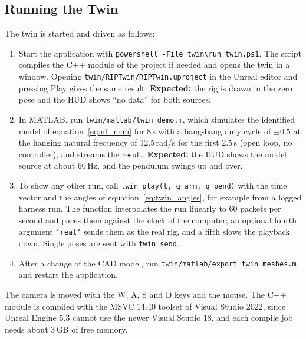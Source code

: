 \documentclass[a4paper,11pt]{article}
\begin{document}
\subsection{Running the Twin}
\label{sec:twin_usage}
The twin is started and driven as follows:
\begin{enumerate}
  \item Start the application with \texttt{powershell -File twin\textbackslash run\_twin.ps1}. The script compiles the C++ module of the project if needed and opens the twin in a window. Opening \nolinkurl{twin/RIPTwin/RIPTwin.uproject} in the Unreal editor and pressing Play gives the same result. \textbf{Expected:} the rig is drawn in the zero pose and the HUD shows ``no data'' for both sources.
  \item In MATLAB, run \nolinkurl{twin/matlab/twin_demo.m}, which simulates the identified model of equation~\ref{eq:nl_num} for 8\,s with a bang-bang duty cycle of $\pm 0.5$ at the hanging natural frequency of 12.5\,rad/s for the first 2.5\,s (open loop, no controller), and streams the result. \textbf{Expected:} the HUD shows the model source at about 60\,Hz, and the pendulum swings up and over.
  \item To show any other run, call \texttt{twin\_play(t, q\_arm, q\_pend)} with the time vector and the angles of equation~\ref{eq:twin_angles}, for example from a logged harness run. The function interpolates the run linearly to 60 packets per second and paces them against the clock of the computer; an optional fourth argument \texttt{'real'} sends them as the real rig, and a fifth slows the playback down. Single poses are sent with \texttt{twin\_send}.
  \item After a change of the CAD model, run \nolinkurl{twin/matlab/export_twin_meshes.m} and restart the application.
\end{enumerate}
The camera is moved with the W, A, S and D keys and the mouse. The C++ module is compiled with the MSVC 14.40 toolset of Visual Studio 2022, since Unreal Engine 5.3 cannot use the newer Visual Studio 18, and each compile job needs about 3\,GB of free memory.
\end{document}
